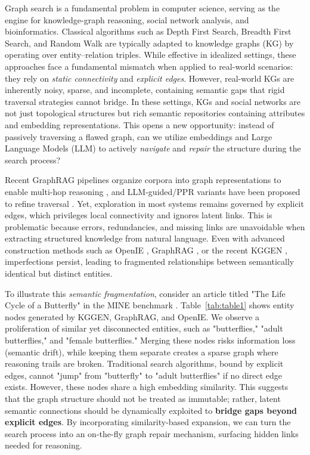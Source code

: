 \documentclass{article}
\theoremstyle{plain}
\theoremstyle{definition}
\theoremstyle{remark}
\begin{document}
Graph search is a fundamental problem in computer science, serving as the engine for knowledge-graph reasoning, social network analysis, and bioinformatics. Classical algorithms such as Depth First Search, Breadth First Search, and Random Walk are typically adapted to knowledge graphs (KG) by operating over entity–relation triples. While effective in idealized settings, these approaches face a fundamental mismatch when applied to real-world scenarios: they rely on \textit{static connectivity} and \textit{explicit edges}. However, real-world KGs are inherently noisy, sparse, and incomplete, containing semantic gaps that rigid traversal strategies cannot bridge. In these settings, KGs \citep{hogan2021knowledge, ji2021survey, paulheim2017knowledge} and social networks \citep{newman2003structure, easley2010networks} are not just topological structures but rich semantic repositories containing attributes and embedding representations. This opens a new opportunity: instead of passively traversing a flawed graph, can we utilize embeddings and Large Language Models (LLM) \citep{team2023gemini, dubey2024llama, openai_gpt4o_2024, zhipuai2024glm4} to actively \textit{navigate} and \textit{repair} the structure during the search process?

Recent GraphRAG pipelines organize corpora into graph representations to enable multi-hop reasoning \citep{saxena2020improving, procko2024graph, hu-etal-2025-grag}, and LLM-guided/PPR variants have been proposed to refine traversal \citep{thinkongraph2024, thinkongraph2025, jimenez2024hipporag}. Yet, exploration in most systems remains governed by explicit edges, which privileges local connectivity and ignores latent links. This is problematic because errors, redundancies, and missing links are unavoidable when extracting structured knowledge from natural language. Even with advanced construction methods such as OpenIE \citep{angeli2015leveraging}, GraphRAG \citep{edge2024local}, or the recent KGGEN \citep{mo2025kggen}, imperfections persist, leading to fragmented relationships between semantically identical but distinct entities. 

To illustrate this \textit{semantic fragmentation}, consider an article titled "The Life Cycle of a Butterfly" in the MINE benchmark \citep{mo2025kggen}. Table~\ref{tab:table1} shows entity nodes generated by KGGEN, GraphRAG, and OpenIE. We observe a proliferation of similar yet disconnected entities, such as "butterflies," "adult butterflies," and "female butterflies." Merging these nodes risks information loss (semantic drift), while keeping them separate creates a sparse graph where reasoning trails are broken. Traditional search algorithms, bound by explicit edges, cannot "jump" from "butterfly" to "adult butterflies" if no direct edge exists. However, these nodes share a high embedding similarity. This suggests that the graph structure should not be treated as immutable; rather, latent semantic connections should be dynamically exploited to \textbf{bridge gaps beyond explicit edges}. By incorporating similarity-based expansion, we can turn the search process into an on-the-fly graph repair mechanism, surfacing hidden links needed for reasoning.
\end{document}
